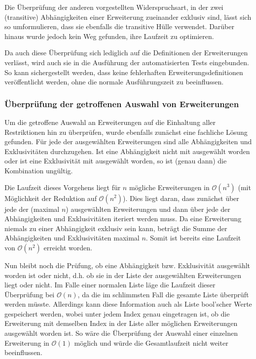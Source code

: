 Die Überprüfung der anderen vorgestellten Widerspruchsart, in der zwei (transitive) Abhängigkeiten einer Erweiterung zueinander exklusiv sind, lässt sich so umformulieren, dass sie ebenfalls die transitive Hülle verwendet. Darüber hinaus wurde jedoch kein Weg gefunden, ihre Laufzeit zu optimieren.

Da auch diese Überprüfung sich lediglich auf die Definitionen der Erweiterungen verlässt, wird auch sie in die Ausführung der automatisierten Tests eingebunden. So kann sichergestellt werden, dass keine fehlerhaften Erweiterungsdefinitionen veröffentlicht werden, ohne die normale Ausführungszeit zu beeinflussen.

\subsubsection{Überprüfung der getroffenen Auswahl von Erweiterungen}
\label{impl:verify_chosen_extensions}
Um die getroffene Auswahl an Erweiterungen auf die Einhaltung aller Restriktionen hin zu überprüfen, wurde ebenfalls zunächst eine fachliche Lösung gefunden. Für jede der ausgewählten Erweiterungen sind alle Abhängigkeiten und Exklusivitäten durchzugehen. Ist eine Abhängigkeit nicht mit ausgewählt worden oder ist eine Exklusivität mit ausgewählt worden, so ist (genau dann) die Kombination ungültig.

Die Laufzeit dieses Vorgehens liegt für $n$ mögliche Erweiterungen in $\mathcal{O}(n^3)$ (mit Möglichkeit der Reduktion auf $\mathcal{O}(n^2)$). Dies liegt daran, dass zunächst über jede der (maximal $n$) ausgewählten Erweiterungen und dann über jede der Abhängigkeiten und Exklusivitäten iteriert werden muss. Da eine Erweiterung niemals zu einer Abhängigkeit exklusiv sein kann, beträgt die Summe der Abhängigkeiten und Exklusivitäten maximal $n$. Somit ist bereits eine Laufzeit von $\mathcal{O}(n^2)$ erreicht worden.

Nun bleibt noch die Prüfung, ob eine Abhängigkeit bzw. Exklusivität ausgewählt worden ist oder nicht, d.h. ob sie in der Liste der ausgewählten Erweiterungen liegt oder nicht. Im Falle einer normalen Liste läge die Laufzeit dieser Überprüfung bei $\mathcal{O}(n)$, da die im schlimmsten Fall die gesamte Liste überprüft werden müsste. Allerdings kann diese Information auch als Liste bool'scher Werte gespeichert werden, wobei unter jedem Index genau eingetragen ist, ob die Erweiterung mit demselben Index in der Liste aller möglichen Erweiterungen ausgewählt worden ist. So wäre die Überprüfung der Auswahl einer einzelnen Erweiterung in $\mathcal{O}(1)$ möglich und würde die Gesamtlaufzeit nicht weiter beeinflussen.

